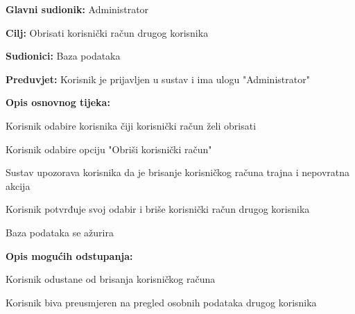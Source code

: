 					\noindent {}
					\begin{packed_item}
	
						\item \textbf{Glavni sudionik: }Administrator
						\item  \textbf{Cilj:} Obrisati korisnički račun drugog korisnika
						\item  \textbf{Sudionici:} Baza podataka
						\item  \textbf{Preduvjet:} Korisnik je prijavljen u sustav i ima ulogu "Administrator"
						\item  \textbf{Opis osnovnog tijeka:}
						
						\item[] \begin{packed_enum}
	
							\item Korisnik odabire korisnika čiji korisnički račun želi obrisati
							\item Korisnik odabire opciju "Obriši korisnički račun"
							\item Sustav upozorava korisnika da je brisanje korisničkog računa trajna i nepovratna akcija
							\item Korisnik potvrđuje svoj odabir i briše korisnički račun drugog korisnika
							\item Baza podataka se ažurira
						\end{packed_enum}
						
						\item  \textbf{Opis mogućih odstupanja:}
						
						\item[] \begin{packed_item}
	
							\item[4.a] Korisnik odustane od brisanja korisničkog računa
							\item[] \begin{packed_enum}
								
								\item Korisnik biva preusmjeren na pregled osobnih podataka drugog korisnika								
							\end{packed_enum}
							
						\end{packed_item}
					\end{packed_item}
					
